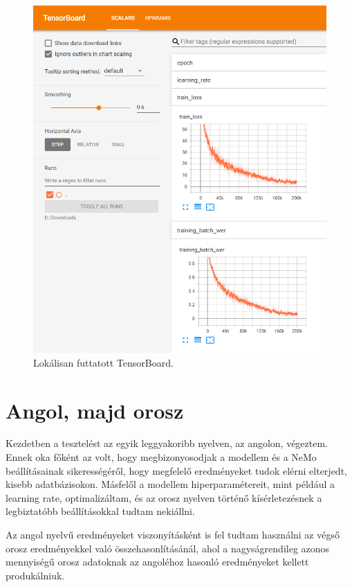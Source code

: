 \begin{figure}[!ht]
\centering
\includegraphics[width=150mm, keepaspectratio]{figures/tensorboard-example.png}
\caption{Lokálisan futtatott TensorBoard.}
\end{figure}

\section{Angol, majd orosz}

Kezdetben a tesztelést az egyik leggyakoribb nyelven, az angolon, végeztem. Ennek oka főként az volt, hogy megbizonyosodjak a modellem és a NeMo beállításainak sikerességéről, hogy megfelelő eredményeket tudok elérni elterjedt, kisebb adatbázisokon. Másfelől a modellem hiperparamétereit, mint például a learning rate, optimalizáltam, és az orosz nyelven történő kísérletezésnek a legbiztatóbb beállításokkal tudtam nekiállni.

Az angol nyelvű eredményeket viszonyításként is fel tudtam használni az végső orosz eredményekkel való összehasonlításánál, ahol a nagyságrendileg azonos mennyiségű orosz adatoknak az angoléhoz hasonló eredményeket kellett produkálniuk.

